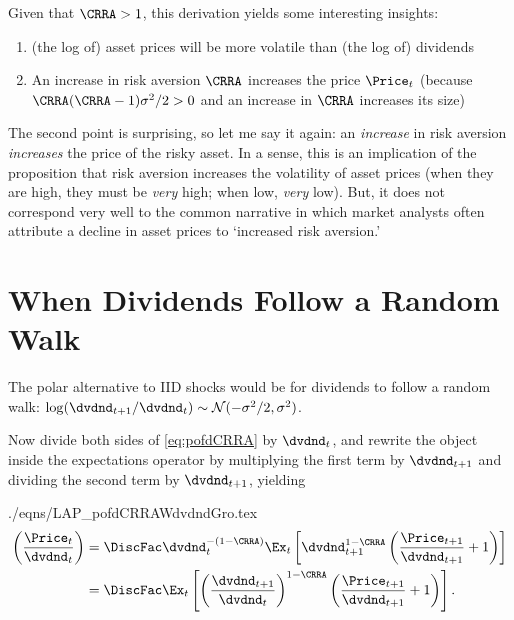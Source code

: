 \documentclass{handout}
\begin{document}
Given that $\CRRA > 1$, this derivation yields some interesting insights:
\begin{enumerate}
  \item (the log of) asset prices will be more volatile than (the log of) dividends
  \item An increase in risk aversion $\CRRA$ increases the price $\Price_{t}$ (because $\CRRA(\CRRA-1)\sigma^{2}/2 > 0$ and an increase in $\CRRA$ increases its size)  %
\end{enumerate}

The second point is surprising, so let me say it again: an \textit{increase} in risk aversion \textit{increases} the price of the risky asset.  In a sense, this is an implication of the proposition that risk aversion increases the volatility of asset prices (when they are high, they must be \textit{very} high; when low, \textit{very} low).  But, it does not correspond very well to the common narrative in which market analysts often attribute a decline in asset prices to `increased risk aversion.'  

\section{When Dividends Follow a Random Walk}

The polar alternative to IID shocks would be for dividends to follow a random walk: $\log (\dvdnd_{t+1}/\dvdnd_{t}) \sim \mathcal{N}(-\sigma^{2}/2,\sigma^{2})$.

Now divide both sides of \eqref{eq:pofdCRRA} by $\dvdnd_{t}$, and rewrite the object inside the expectations operator by multiplying the first term by $\dvdnd_{t+1}$ and dividing the second term by $\dvdnd_{t+1}$, yielding
\begin{verbatimwrite}{./eqns/LAP_pofdCRRAWdvdndGro.tex}
\begin{equation}\begin{gathered}\begin{aligned}
 \left(\frac{\Price_{t}}{\dvdnd_{t}}\right) & =  \DiscFac \dvdnd_{t}^{-(1-\CRRA)} \Ex_{t}\left[\dvdnd_{t+1}^{1-\CRRA}\left(\frac{\Price_{t+1}}{\dvdnd_{t+1}}+1\right)\right] 
\\ & =   \DiscFac  \Ex_{t}\left[\left(\frac{\dvdnd_{t+1}}{\dvdnd_{t}}\right)^{1-\CRRA}\left(\frac{\Price_{t+1}}{\dvdnd_{t+1}}+1\right)\right] \label{eq:pofdCRRAWdvdndGro}
.
\end{aligned}\end{gathered}\end{equation}
\end{verbatimwrite}

\end{document}
